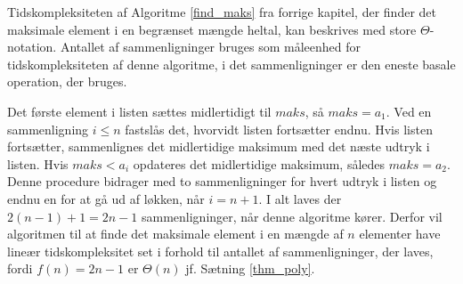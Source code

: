 \begin{exmp}
Tidskompleksiteten af Algoritme \ref{find_maks} fra forrige kapitel, der finder det maksimale element i en begrænset mængde heltal, kan beskrives med store $\Theta$-notation. 
Antallet af sammenligninger bruges som måleenhed for tidskompleksiteten af denne algoritme, i det sammenligninger er den eneste basale operation, der bruges.

Det første element i listen sættes midlertidigt til $maks$, så $maks=a_1$. 
Ved en sammenligning $i \leq n$ fastslås det, hvorvidt listen fortsætter endnu. Hvis listen fortsætter, sammenlignes det midlertidige maksimum med det næste udtryk i listen. 
Hvis $maks<a_i$ opdateres det midlertidige maksimum, således $maks=a_2$.
Denne procedure bidrager med to sammenligninger for hvert udtryk i listen og endnu en for at gå ud af løkken, når $i=n+1$. 
I alt laves der $2(n-1)+1=2n-1$ sammenligninger, når denne algoritme kører. 
Derfor vil algoritmen til at finde det maksimale element i en mængde af $n$ elementer have lineær tidskompleksitet set i forhold til antallet af sammenligninger, der laves, fordi $f(n)=2n-1$ er $\Theta (n)$ jf. Sætning \ref{thm_poly}.  
\end{exmp}

